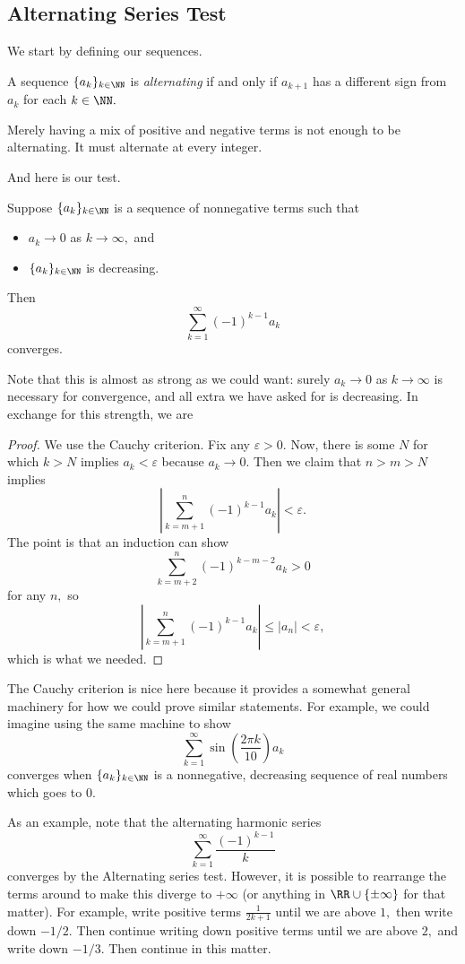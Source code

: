 \subsection{Alternating Series Test}
We start by defining our sequences.
\begin{definition}[Alternating]
	A sequence $\{a_k\}_{k\in\NN}$ is \textit{alternating} if and only if $a_{k+1}$ has a different sign from $a_k$ for each $k\in\NN.$
\end{definition}
\begin{warn}
	Merely having a mix of positive and negative terms is not enough to be alternating. It must alternate at every integer.
\end{warn}
And here is our test.
\begin{prop}
	Suppose $\{a_k\}_{k\in\NN}$ is a sequence of nonnegative terms such that
	\begin{itemize}
		\item $a_k\to0$ as $k\to\infty,$ and
		\item $\{a_k\}_{k\in\NN}$ is decreasing.
	\end{itemize}
	Then
	\[\sum_{k=1}^\infty(-1)^{k-1}a_k\]
	converges.
\end{prop}
Note that this is almost as strong as we could want: surely $a_k\to0$ as $k\to\infty$ is necessary for convergence, and all extra we have asked for is decreasing. In exchange for this strength, we are 
\begin{proof}
	We use the Cauchy criterion. Fix any $\varepsilon>0.$ Now, there is some $N$ for which $k>N$ implies $a_k<\varepsilon$ because $a_k\to0.$ Then we claim that $n>m>N$ implies
	\[\left|\sum_{k=m+1}^n(-1)^{k-1}a_k\right|<\varepsilon.\]
	The point is that an induction can show
	\[\sum_{k=m+2}^n(-1)^{k-m-2}a_k>0\]
	for any $n,$ so
	\[\left|\sum_{k=m+1}^n(-1)^{k-1}a_k\right|\le|a_n|<\varepsilon,\]
	which is what we needed.
\end{proof}
\begin{remark}
	The Cauchy criterion is nice here because it provides a somewhat general machinery for how we could prove similar statements. For example, we could imagine using the same machine to show
	\[\sum_{k=1}^\infty\sin\left(\frac{2\pi k}{10}\right)a_k\]
	converges when $\{a_k\}_{k\in\NN}$ is a nonnegative, decreasing sequence of real numbers which goes to $0.$
\end{remark}
As an example, note that the alternating harmonic series
\[\sum_{k=1}^\infty\frac{(-1)^{k-1}}k\]
converges by the Alternating series test. However, it is possible to rearrange the terms around to make this diverge to $+\infty$ (or anything in $\RR\cup\{\pm\infty\}$ for that matter). For example, write positive terms $\frac1{2k+1}$ until we are above $1,$ then write down $-1/2.$ Then continue writing down positive terms until we are above $2,$ and write down $-1/3.$ Then continue in this matter.

